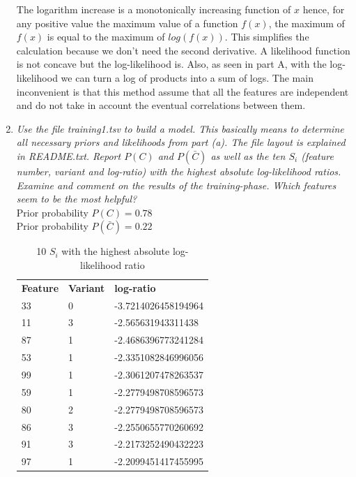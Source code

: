 \documentclass[10pt,a4paper]{article}
\begin{document}
\begin{enumerate}
The logarithm increase is a monotonically increasing function of $x$ hence, for any positive value the maximum value of a function $f(x)$, the maximum of $f(x)$ is equal to the maximum of $log(f(x))$. This simplifies the calculation because we don't need the second derivative. A likelihood function is not concave but the log-likelihood is. Also, as seen in part A, with the log-likelihood we can turn a log of products into a sum of logs. The main inconvenient is that this method assume that all the features are independent and do not take in account the eventual correlations between them. 




\newpage
\item \textit{Use the file training1.tsv to build a model. This basically means to determine all necessary
	priors and likelihoods from part (a). The file layout is explained in README.txt. Report
	$P(C)$ and $P(\bar{C})$ as well as the ten $S_i$ (feature number, variant and log-ratio) with the highest
	absolute log-likelihood ratios. Examine and comment on the results of the training-phase.
	Which features seem to be the most helpful?
}\\

Prior probability $P(C) = 0.78$\\
Prior probability $P(\bar{C}) = 0.22$\\

 



\begin{table}[H]
	\centering
	\caption{10 $S_i$ with the highest absolute log-likelihood ratio}
	\label{10most}
	\begin{tabular}{|l|l|l|}
		\textbf{Feature} & \textbf{Variant} & \textbf{log-ratio} \\
		33 & 0 & -3.7214026458194964 \\
		11 & 3 & -2.565631943311438  \\
		87 & 1 & -2.4686396773241284 \\
		53 & 1 & -2.3351082846996056 \\
		99 & 1 & -2.3061207478263537 \\
		59 & 1 & -2.2779498708596573 \\
		80 & 2 & -2.2779498708596573 \\
		86 & 3 & -2.2550655770260692 \\
		91 & 3 & -2.2173252490432223 \\
		97 & 1 & -2.2099451417455995
	\end{tabular}
\end{table}



\end{enumerate}
\end{document}
